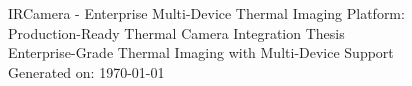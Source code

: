 \documentclass[11pt]{report}
\begin{document}
\begin{titlepage}
	\centering
	{\LARGE IRCamera - Enterprise Multi-Device Thermal Imaging Platform:\\[0.5ex]}
	{\LARGE Production-Ready Thermal Camera Integration Thesis\\[1ex]}
	{\large Enterprise-Grade Thermal Imaging with Multi-Device Support}\\[1ex]
	{\large Generated on: \today}
\end{titlepage}

\tableofcontents
\clearpage








\clearpage
{}
\renewcommand{\bibname}{References}



\appendix
\clearpage









\end{document}
